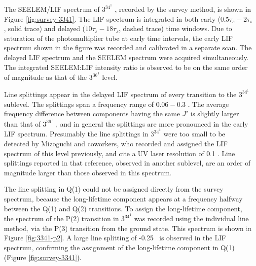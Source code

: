 \documentclass[12pt]{mitthesis}
\begin{document}

The SEELEM/LIF spectrum of $3^34^1$ , recorded by the survey
method, is shown in Figure \ref{fig:survey-3341}.  The LIF spectrum is
integrated in both early ($0.5\tau_s-2\tau_s$, solid trace) and
delayed ($10\tau_s-18\tau_s$, dashed trace) time windows.  Due to
saturation of the photomultiplier tube at early time intervals, the
early LIF spectrum shown in the figure was recorded and calibrated in
a separate scan.  The delayed LIF spectrum and the SEELEM spectrum
were acquired simultaneously.  The integrated SEELEM:LIF intensity
ratio is observed to be on the same order of magnitude as that of the
$3^36^1$  level.

Line splittings appear in the delayed LIF spectrum of every transition
to the $3^34^1$  sublevel.  The splittings span a frequency
range of $0.06-0.3$ \rcm.  The average frequency difference between
components having the same $J'$ is slightly larger than that of
$3^36^1$ , and in general the splittings are more pronounced in the early
LIF spectrum.  Presumably the line splittings in $3^34^1$  were
too small to be detected by Mizoguchi and coworkers, who recorded and
assigned the LIF spectrum of this level previously, and cite a UV
laser resolution of 0.1 \rcm \cite{mizoguchi00}.  Line splittings
reported in that reference, observed in another sublevel, are an order
of magnitude larger than those observed in this spectrum.

The line splitting in Q(1) could not be assigned directly from the
survey spectrum, because the long-lifetime component appears at a
frequency halfway between the Q(1) and Q(2) transitions.  To assign
the long-lifetime component, the spectrum of the P(2) transition in
$3^34^1$  was recorded using the individual line method, via the P(3)
transition from the ground state.  This spectrum is shown in Figure
\ref{fig:3341-p2}.  A large line splitting of -0.25 \rcm\ is observed
in the LIF spectrum, confirming the assignment of the long-lifetime
component in Q(1) (Figure \ref{fig:survey-3341}).

\end{document}
